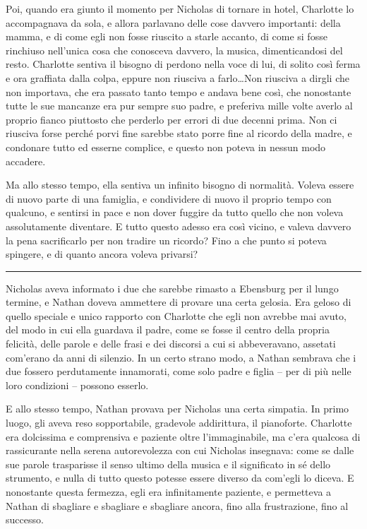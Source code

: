 \documentclass[a4paper,oneside,11pt]{memoir}
\begin{document}
Poi, quando era giunto il momento per Nicholas di tornare in hotel, Charlotte lo accompagnava da
sola, e allora parlavano delle cose davvero importanti: della mamma, e di come egli non fosse
riuscito a starle accanto, di come si fosse rinchiuso nell'unica cosa che conosceva davvero, la
musica, dimenticandosi del resto. Charlotte sentiva il bisogno di perdono nella voce di lui, di
solito così ferma e ora graffiata dalla colpa, eppure non riusciva a farlo\dots Non riusciva a
dirgli che non importava, che era passato tanto tempo e andava bene così, che nonostante tutte le
sue mancanze era pur sempre suo padre, e preferiva mille volte averlo al proprio fianco piuttosto
che perderlo per errori di due decenni prima. Non ci riusciva forse perché porvi fine sarebbe stato
porre fine al ricordo della madre, e condonare tutto ed esserne complice, e questo non poteva in
nessun modo accadere.

Ma allo stesso tempo, ella sentiva un infinito bisogno di normalità. Voleva essere di nuovo parte di
una famiglia, e condividere di nuovo il proprio tempo con qualcuno, e sentirsi in pace e non dover
fuggire da tutto quello che non voleva assolutamente diventare. E tutto questo adesso era così
vicino, e valeva davvero la pena sacrificarlo per non tradire un ricordo? Fino a che punto si poteva
spingere, e di quanto ancora voleva privarsi?

\plainbreak{1}

Nicholas aveva informato i due che sarebbe rimasto a Ebensburg per il lungo termine, e Nathan doveva
ammettere di provare una certa gelosia. Era geloso di quello speciale e unico rapporto con Charlotte
che egli non avrebbe mai avuto, del modo in cui ella guardava il padre, come se fosse il centro
della propria felicità, delle parole e delle frasi e dei discorsi a cui si abbeveravano, assetati
com'erano da anni di silenzio. In un certo strano modo, a Nathan sembrava che i due fossero
perdutamente innamorati, come solo padre e figlia -- per di più nelle loro condizioni -- possono
esserlo.

E allo stesso tempo, Nathan provava per Nicholas una certa simpatia. In primo luogo, gli aveva reso
sopportabile, gradevole addirittura, il pianoforte. Charlotte era dolcissima e comprensiva e
paziente oltre l'immaginabile, ma c'era qualcosa di rassicurante nella serena autorevolezza con cui
Nicholas insegnava: come se dalle sue parole trasparisse il senso ultimo della musica e il
significato in sé dello strumento, e nulla di tutto questo potesse essere diverso da com'egli lo
diceva. E nonostante questa fermezza, egli era infinitamente paziente, e permetteva a Nathan di
sbagliare e sbagliare e sbagliare ancora, fino alla frustrazione, fino al successo.
\end{document}

